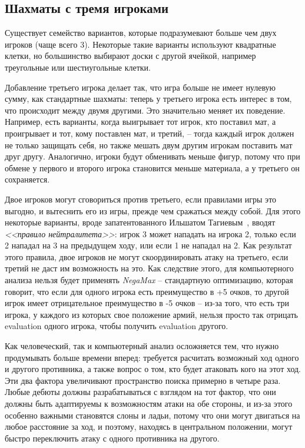 \documentclass{article}
\begin{document}
\subsection{Шахматы с тремя игроками}

Существует семейство вариантов,
которые подразумевают больше чем двух игроков
(чаще всего 3).
Некоторые такие варианты используют квадратные клетки,
но большинство выбирают доски с другой ячейкой,
например треугольные или шестиугольные клетки.

Добавление третьего игрока делает так, что игра больше не имеет нулевую сумму,
как стандартные шахматы:
теперь у третьего игрока есть интерес в том, что происходит между двумя другими.
Это значительно меняет их поведение.
Например, есть варианты, когда выигрывает тот игрок, кто поставил мат,
а проигрывает и тот, кому поставлен мат, и третий, -- 
тогда каждый игрок должен не только защищать себя, но также мешать двум другим игрокам поставить мат друг другу.
Аналогично, игроки будут обменивать меньше фигур,
потому что при обмене у первого и второго игрока становится меньше материала,
а у третьего он сохраняется.

Двое игроков могут сговориться против третьего, если правилами игры это выгодно,
и вытеснить его из игры, прежде чем сражаться между собой.
Для этого некоторые варианты, вроде запатентованного Ильшатом Тагиевым~\cite{triad-chess},
вводят \emph{<<правило нейтралитета>>}:
игрок 3 может нападать на игрока 2, только если 2 нападал на 3 на предыдущем ходу,
или если 1 не нападал на 2. 
Как результат этого правила, двое игроков не могут скоординировать атаку на третьего,
если третий не даст им возможность на это. 
Как следствие этого, для компьютерного анализа нельзя будет применять \emph{NegaMax} --
стандартную оптимизацию, которая говорит, что если для одного игрока есть преимущество в +5 очков,
то другой игрок имеет отрицательное преимущество в -5 очков -- 
из-за того, что есть три игрока, у каждого из которых свое положение армий,
нельзя просто так отрицать evaluation одного игрока, 
чтобы получить evaluation другого.

Как человеческий, так и компьютерный анализ осложняется тем, что нужно продумывать больше времени вперед:
требуется расчитать возможный ход одного и другого противника, а также
вопрос о том, кто будет атаковать кого на этот ход. 
Эти два фактора увеличивают пространство поиска примерно в четыре раза. 
Любые дебюты должны разрабатываться с взглядом на тот фактор,
что они должны быть адаптируемы к возможностям атаки на обе стороны,
и из-за этого особенно важными становятся слоны и ладьи,
потому что они могут двигаться на любое расстояние за ход,
и поэтому, находясь в центральном положении,
могут быстро переключить атаку с одного противника на другого.
\end{document}
